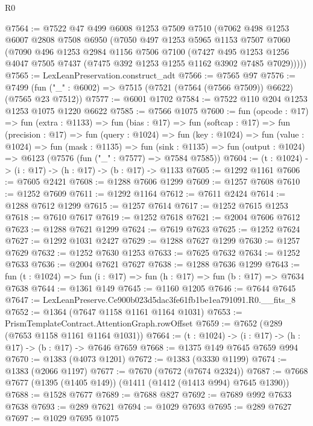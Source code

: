 \begin{lexlean}{R0}
\begin{coremodule}
@7564 := @7522
    @47
    @499
    @6008
    @1253
    @7509
    @7510
    (@7062
      @498
      @1253
      @6007
      @2808
      @7508
      @6950
      (@7050
        @497
        @1253
        @5965
        @1153
        @7507
        @7060
        (@7090
          @496
          @1253
          @2984
          @1156
          @7506
          @7100
          (@7427
            @495
            @1253
            @1256
            @4047
            @7505
            @7437
            (@7475 @392 @1253 @1255 @1162 @3902 @7485 @7029)))))
@7565 := LexLeanPreservation.construct_adt
@7566 := @7565 @97
@7576 := @7499 (fun ("_" : @6002) => @7515 (@7521 (@7564 (@7566 @7509)) @6622) (@7565 @23 @7512))
@7577 := @6001 @1702
@7584 := @7522 @110 @204 @1253 @1253 @1075 @1220 @6622
@7585 := @7566 @1075
@7600 := fun (opcode : @17) =>
  fun (extra : @1133) =>
  fun (bias : @17) =>
  fun (softcap : @17) =>
  fun (precision : @17) =>
  fun (query : @1024) =>
  fun (key : @1024) =>
  fun (value : @1024) =>
  fun (mask : @1135) =>
  fun (sink : @1135) => fun (output : @1024) => @6123 (@7576 (fun ("_" : @7577) => @7584 @7585))
@7604 := (t : @1024) -> (i : @17) -> (h : @17) -> (b : @17) -> @1133
@7605 := @1292 @1161
@7606 := @7605 @2421
@7608 := @1288 @7606 @1299
@7609 := @1257 @7608
@7610 := @1252 @7609
@7611 := @1292 @1164
@7612 := @7611 @2424
@7614 := @1288 @7612 @1299
@7615 := @1257 @7614
@7617 := @1252 @7615 @1253
@7618 := @7610 @7617
@7619 := @1252 @7618
@7621 := @2004 @7606 @7612
@7623 := @1288 @7621 @1299
@7624 := @7619 @7623
@7625 := @1252 @7624
@7627 := @1292 @1031 @2427
@7629 := @1288 @7627 @1299
@7630 := @1257 @7629
@7632 := @1252 @7630 @1253
@7633 := @7625 @7632
@7634 := @1252 @7633
@7636 := @2004 @7621 @7627
@7638 := @1288 @7636 @1299
@7643 := fun (t : @1024) => fun (i : @17) => fun (h : @17) => fun (b : @17) => @7634 @7638
@7644 := @1361 @149
@7645 := @1160 @1205
@7646 := @7644 @7645
@7647 := LexLeanPreserve.Ce900b023d5dac3fe61fb1be1ea791091.R0.__fits_8
@7652 := @1364 (@7647 @1158 @1161 @1164 @1031)
@7653 := PrismTemplateContract.AttentionGraph.rowOffset
@7659 := @7652 (@289 (@7653 @1158 @1161 @1164 @1031))
@7664 := (t : @1024) -> (i : @17) -> (h : @17) -> (b : @17) -> @7646 @7659
@7668 := @1375 @149 @7645 @7659 @994
@7670 := @1383 (@4073 @1201)
@7672 := @1383 (@3330 @1199)
@7674 := @1383 (@2066 @1197)
@7677 := @7670 (@7672 (@7674 @2324))
@7687 := @7668 @7677 (@1395 (@1405 @149)) (@1411 (@1412 (@1413 @994) @7645 @1390))
@7688 := @1528 @7677
@7689 := @7688 @827
@7692 := @7689 @992 @7633 @7638
@7693 := @289 @7621
@7694 := @1029 @7693
@7695 := @289 @7627
@7697 := @1029 @7695 @1075

\end{coremodule}
\end{lexlean}
